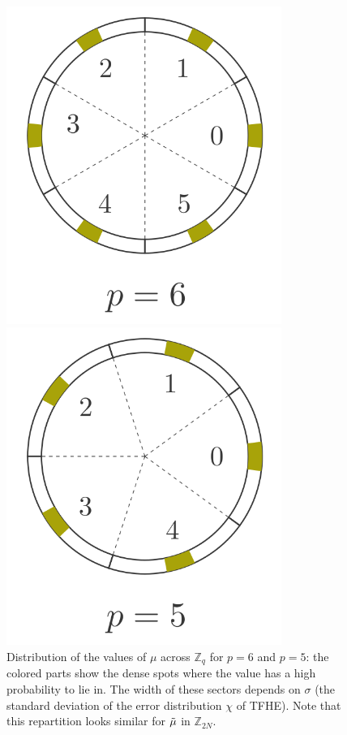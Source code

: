 \begin{figure}[h]
	\centering
	\begin{minipage}{0.47\textwidth}
		\centering
		\includegraphics[width=0.8\textwidth]{img/to_harmonize/busy_sectors_2.png}
	\end{minipage}
	\hspace{0.04\textwidth}
	\begin{minipage}{0.47\textwidth}
		\centering
		\includegraphics[width=0.8\textwidth]{img/to_harmonize/busy_sectors.png}
	\end{minipage}
	\caption{Distribution of the values of $\mu$ across $\mathbb{Z}_q$ for $p = 6$ and $p = 5$: the colored parts show the dense spots where the value has a high probability to lie in. The width of these sectors depends on $\sigma$ (the standard deviation of the error distribution $\chi$ of \gls{TFHE}). Note that this repartition looks similar for $\Tilde{\mu}$ in $\mathbb{Z}_{2N}$.}
	\label{fig:density_of_phase}
\end{figure}


